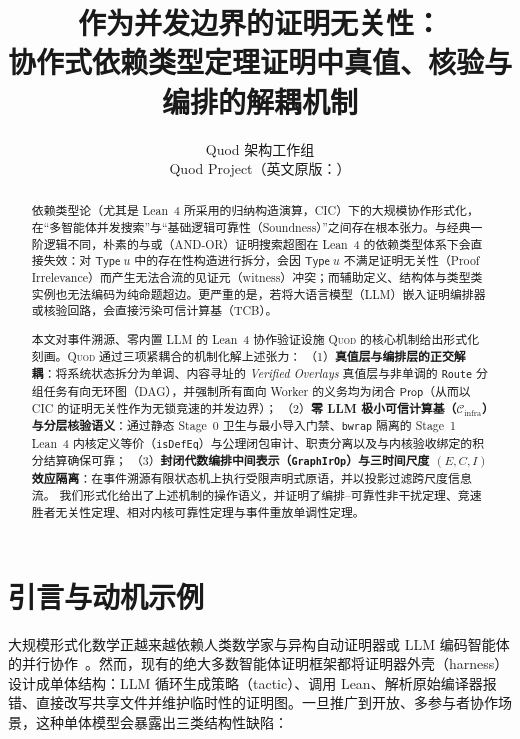 \documentclass[10pt,a4paper,fontset=fandol]{ctexart}
\title{\textbf{作为并发边界的证明无关性：}\\
\large 协作式依赖类型定理证明中真值、核验与编排的解耦机制}
\author{Quod 架构工作组\\
\small Quod Project（英文原版：\code{quod-core-mechanisms.pdf}）}
\date{}
\newcommand{\Cinfra}{\mathcal{C}_{\mathrm{infra}}}
\newcommand{\Prop}{\mathsf{Prop}}
\newcommand{\TypeU}{\mathsf{Type}\;u}
\newcommand{\code}[1]{\texttt{#1}}
\begin{document}
\maketitle

\begin{abstract}
依赖类型论（尤其是 Lean~4 所采用的归纳构造演算，CIC）下的大规模协作形式化，在“多智能体并发搜索”与“基础逻辑可靠性（Soundness）”之间存在根本张力。与经典一阶逻辑不同，朴素的与或（AND-OR）证明搜索超图在 Lean~4 的依赖类型体系下会直接失效：对 $\TypeU$ 中的存在性构造进行拆分，会因 $\TypeU$ 不满足证明无关性（Proof Irrelevance）而产生无法合流的见证元（witness）冲突；而辅助定义、结构体与类型类实例也无法编码为纯命题超边。更严重的是，若将大语言模型（LLM）嵌入证明编排器或核验回路，会直接污染可信计算基（TCB）。

本文对事件溯源、零内置 LLM 的 Lean~4 协作验证设施 \textsc{Quod} 的核心机制给出形式化刻画。\textsc{Quod} 通过三项紧耦合的机制化解上述张力：
（1）\textbf{真值层与编排层的正交解耦}：将系统状态拆分为单调、内容寻址的 \emph{Verified Overlays} 真值层与非单调的 \code{Route} 分组任务有向无环图（DAG），并强制所有面向 Worker 的义务均为闭合 $\Prop$（从而以 CIC 的证明无关性作为无锁竞速的并发边界）；
（2）\textbf{零 LLM 极小可信计算基（$\Cinfra$）与分层核验语义}：通过静态 Stage~0 卫生与最小导入门禁、\code{bwrap} 隔离的 Stage~1 Lean~4 内核定义等价（\code{isDefEq}）与公理闭包审计、职责分离以及与内核验收绑定的积分结算确保可靠；
（3）\textbf{封闭代数编排中间表示（\code{GraphIrOp}）与三时间尺度 $(E, C, I)$ 效应隔离}：在事件溯源有限状态机上执行受限声明式原语，并以投影过滤跨尺度信息流。
我们形式化给出了上述机制的操作语义，并证明了编排--可靠性非干扰定理、竞速胜者无关性定理、相对内核可靠性定理与事件重放单调性定理。
\end{abstract}

\section{引言与动机示例}\label{sec:intro}

大规模形式化数学正越来越依赖人类数学家与异构自动证明器或 LLM 编码智能体的并行协作~\cite{demoura2021lean4,mathlib2020}。然而，现有的绝大多数智能体证明框架都将证明器外壳（harness）设计成单体结构：LLM 循环生成策略（tactic）、调用 Lean、解析原始编译器报错、直接改写共享文件并维护临时性的证明图。一旦推广到开放、多参与者协作场景，这种单体模型会暴露出三类结构性缺陷：
\end{document}
